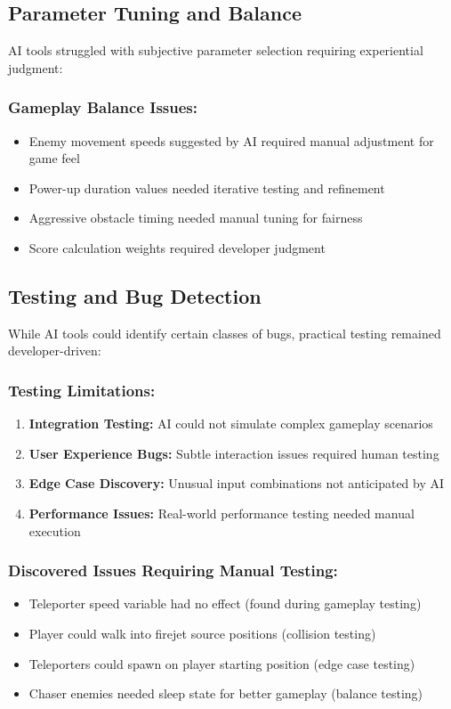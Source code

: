 \documentclass[12pt,a4paper]{article}
\begin{document}
\subsection{Parameter Tuning and Balance}

AI tools struggled with subjective parameter selection requiring experiential judgment:

\subsubsection*{Gameplay Balance Issues:}
\begin{itemize}
    \item Enemy movement speeds suggested by AI required manual adjustment for game feel
    \item Power-up duration values needed iterative testing and refinement
    \item Aggressive obstacle timing needed manual tuning for fairness
    \item Score calculation weights required developer judgment
\end{itemize}

\subsection{Testing and Bug Detection}

While AI tools could identify certain classes of bugs, practical testing remained developer-driven:

\subsubsection*{Testing Limitations:}
\begin{enumerate}
    \item \textbf{Integration Testing:} AI could not simulate complex gameplay scenarios
    \item \textbf{User Experience Bugs:} Subtle interaction issues required human testing
    \item \textbf{Edge Case Discovery:} Unusual input combinations not anticipated by AI
    \item \textbf{Performance Issues:} Real-world performance testing needed manual execution
\end{enumerate}

\subsubsection*{Discovered Issues Requiring Manual Testing:}
\begin{itemize}
    \item Teleporter speed variable had no effect (found during gameplay testing)
    \item Player could walk into firejet source positions (collision testing)
    \item Teleporters could spawn on player starting position (edge case testing)
    \item Chaser enemies needed sleep state for better gameplay (balance testing)
\end{itemize}
\end{document}
